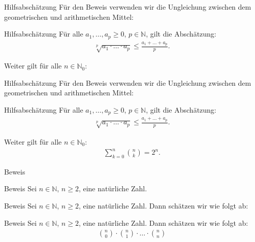 \documentclass[10pt]{beamer}
\def\bN{\mathbb{N}}
\begin{document}
\begin{frame}{Hilfsabschätzung}
    Für den Beweis verwenden wir die Ungleichung zwischen dem geometrischen und arithmetischen Mittel:
    \begin{block}{Hilfsabschätzung}
        Für alle \( a_{1}, \ldots, a_{p} \geq 0 \), \( p \in \bN \), gilt die Abschätzung:
        \begin{align*}
            \sqrt[p]{a_{1} \cdot \ldots \cdot a_{p}} 
            \leq \frac{a_{1} + \ldots + a_{p}}{p}.
        \end{align*}
    \end{block}
    Weiter gilt für alle \( n \in \bN_{0} \):   
\end{frame}



\begin{frame}{Hilfsabschätzung}
    Für den Beweis verwenden wir die Ungleichung zwischen dem geometrischen und arithmetischen Mittel:
    \begin{block}{Hilfsabschätzung}
        Für alle \( a_{1}, \ldots, a_{p} \geq 0 \), \( p \in \bN \), gilt die Abschätzung:
        \begin{align*}
            \sqrt[p]{a_{1} \cdot \ldots \cdot a_{p}} 
            \leq \frac{a_{1} + \ldots + a_{p}}{p}.
        \end{align*}
    \end{block}
    Weiter gilt für alle \( n \in \bN_{0} \):
    \begin{align*}
        \sum_{k = 0}^{n} \binom{n}{k}
        = 2^{n}.
    \end{align*}
\end{frame}



\begin{frame}{Beweis}
    
\end{frame}



\begin{frame}{Beweis}
    Sei \( n \in \bN \), \( n \geq 2 \), eine natürliche Zahl.
\end{frame}



\begin{frame}{Beweis}
    Sei \( n \in \bN \), \( n \geq 2 \), eine natürliche Zahl. Dann schätzen wir wie folgt ab:
\end{frame}



\begin{frame}{Beweis}
    Sei \( n \in \bN \), \( n \geq 2 \), eine natürliche Zahl. Dann schätzen wir wie folgt ab:
    \begin{align*}
        \binom{n}{0} \cdot \binom{n}{1} \cdot \ldots \cdot \binom{n}{n}
    \end{align*}
\end{frame}
\end{document}
